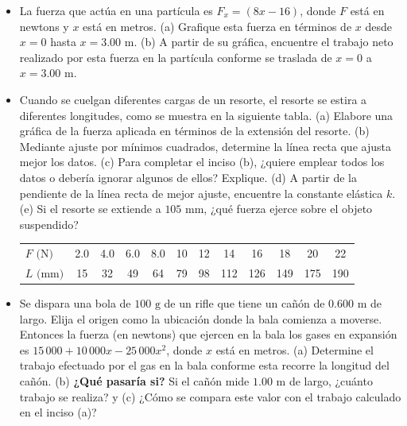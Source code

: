 \documentclass[11pt,a4paper]{article}
\begin{document}
\newpage

\begin{itemize}
    \item[\textbf{16.}] La fuerza que actúa en una partícula es $F_x = (8x - 16)$, donde $F$ está en newtons y $x$ está en metros. (a) Grafique esta fuerza en términos de $x$ desde $x = 0$ hasta $x = 3.00 \text{ m}$. (b) A partir de su gráfica, encuentre el trabajo neto realizado por esta fuerza en la partícula conforme se traslada de $x = 0$ a $x = 3.00 \text{ m}$.
    \vspace*{6cm}

    \item[\textbf{17.}] Cuando se cuelgan diferentes cargas de un resorte, el resorte se estira a diferentes longitudes, como se muestra en la siguiente tabla. (a) Elabore una gráfica de la fuerza aplicada en términos de la extensión del resorte. (b) Mediante ajuste por mínimos cuadrados, determine la línea recta que ajusta mejor los datos. (c) Para completar el inciso (b), ¿quiere emplear todos los datos o debería ignorar algunos de ellos? Explique. (d) A partir de la pendiente de la línea recta de mejor ajuste, encuentre la constante elástica $k$. (e) Si el resorte se extiende a $105 \text{ mm}$, ¿qué fuerza ejerce sobre el objeto suspendido?
    
    \begin{center}
    \begin{tabular}{lccccccccccc}
    \hline
    $F \text{ (N)}$ & 2.0 & 4.0 & 6.0 & 8.0 & 10 & 12 & 14 & 16 & 18 & 20 & 22 \\
    $L \text{ (mm)}$ & 15 & 32 & 49 & 64 & 79 & 98 & 112 & 126 & 149 & 175 & 190 \\
    \hline
    \end{tabular}
    \end{center}
    \vspace*{7cm}

    \item[\textbf{18.}] Se dispara una bola de $100 \text{ g}$ de un rifle que tiene un cañón de $0.600 \text{ m}$ de largo. Elija el origen como la ubicación donde la bala comienza a moverse. Entonces la fuerza (en newtons) que ejercen en la bala los gases en expansión es $15\,000 + 10\,000x - 25\,000x^2$, donde $x$ está en metros. (a) Determine el trabajo efectuado por el gas en la bala conforme esta recorre la longitud del cañón. (b) \textbf{¿Qué pasaría si?} Si el cañón mide $1.00 \text{ m}$ de largo, ¿cuánto trabajo se realiza? y (c) ¿Cómo se compara este valor con el trabajo calculado en el inciso (a)?
    \vspace*{6cm}


\end{itemize}
\end{document}
